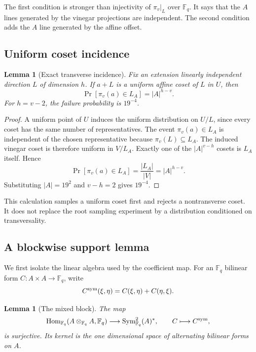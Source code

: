 \documentclass[11pt]{article}
\newcommand{\F}{\mathbb F}
\newcommand{\Sym}{\operatorname{Sym}}
\newcommand{\Hom}{\operatorname{Hom}}
\theoremstyle{plain}
\newtheorem{lemma}[theorem]{Lemma}
\theoremstyle{definition}
\theoremstyle{remark}
\begin{document}
The first condition is stronger than injectivity of $\pi_v|_L$ over
$\F_q$.  It says that the $A$ lines generated by the vinegar projections are
independent.  The second condition adds the $A$ line generated by the affine
offset.

\subsection{Uniform coset incidence}

\begin{lemma}[Exact transverse incidence]
\label{lem:l2-incidence}
Fix an extension linearly independent direction $L$ of dimension $h$.
If $a+L$ is a uniform affine coset of $L$ in $U$, then
\[
  \Pr[\pi_v(a)\in L_A]=|A|^{h-v}.
\]
For $h=v-2$, the failure probability is $19^{-4}$.
\end{lemma}

\begin{proof}
A uniform point of $U$ induces the uniform distribution on $U/L$, since
every coset has the same number of representatives.  The event
$\pi_v(a)\in L_A$ is independent of the chosen representative because
$\pi_v(L)\subseteq L_A$.  The induced vinegar coset is therefore uniform in
$V/L_A$.  Exactly one of the $|A|^{v-h}$ cosets is $L_A$ itself.  Hence
\[
  \Pr[\pi_v(a)\in L_A]=\frac{|L_A|}{|V|}=|A|^{h-v}.
\]
Substituting $|A|=19^2$ and $v-h=2$ gives $19^{-4}$.
\end{proof}

This calculation samples a uniform coset first and rejects a nontransverse
coset.  It does not replace the root sampling experiment by a distribution
conditioned on transversality.

\subsection{A blockwise support lemma}

We first isolate the linear algebra used by the coefficient map.  For an
$\F_q$ bilinear form $C:A\times A\to\F_q$, write
\[
  C^{\rm sym}(\xi,\eta)=C(\xi,\eta)+C(\eta,\xi).
\]

\begin{lemma}[The mixed block]
\label{lem:l2-mixed-block}
The map
\[
  \Hom_{\F_q}(A\otimes_{\F_q}A,\F_q)
  \longrightarrow \Sym^2_{\F_q}(A)^*,
  \qquad C\longmapsto C^{\rm sym},
\]
is surjective.  Its kernel is the one dimensional space of alternating
bilinear forms on $A$.
\end{lemma}
\end{document}
